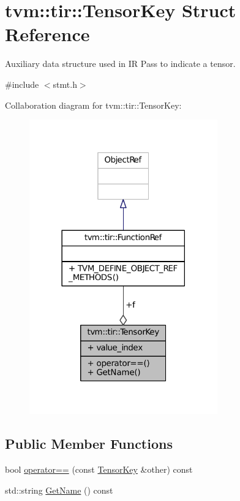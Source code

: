 \hypertarget{structtvm_1_1tir_1_1TensorKey}{}\section{tvm\+:\+:tir\+:\+:Tensor\+Key Struct Reference}
\label{structtvm_1_1tir_1_1TensorKey}


Auxiliary data structure used in IR Pass to indicate a tensor.  




{\ttfamily \#include $<$stmt.\+h$>$}



Collaboration diagram for tvm\+:\+:tir\+:\+:Tensor\+Key\+:
\nopagebreak
\begin{figure}[H]
\begin{center}
\leavevmode
\includegraphics[width=230pt]{structtvm_1_1tir_1_1TensorKey__coll__graph}
\end{center}
\end{figure}
\subsection*{Public Member Functions}
\begin{DoxyCompactItemize}
\item 
bool \hyperlink{structtvm_1_1tir_1_1TensorKey_af94f8de8da447ed38398388169cca8f3}{operator==} (const \hyperlink{structtvm_1_1tir_1_1TensorKey}{Tensor\+Key} \&other) const 
\item 
std\+::string \hyperlink{structtvm_1_1tir_1_1TensorKey_abed90ed178cababfff1ffd90c63f51c4}{Get\+Name} () const 
\end{DoxyCompactItemize}
